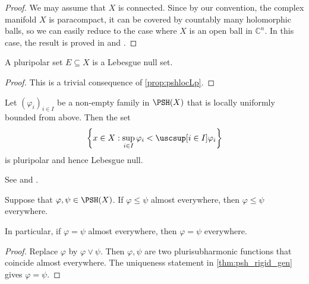 \begin{proof}
    We may assume that $X$ is connected. Since by our convention, the complex manifold $X$ is paracompact, it can be covered by countably many holomorphic balls, so we can easily reduce to the case where $X$ is an open ball in $\mathbb{C}^n$. In this case, the result is proved in \cite[Lemma~4.31]{GZ17} and \cite[Lemma~3.4.1]{FPT}.
\end{proof}



\begin{proposition}\label{prop:ppsnull}
    A pluripolar set $E\subseteq X$ is a Lebesgue null set.
\end{proposition}
\begin{proof}
    This is a trivial consequence of \cref{prop:pshlocLp}.
\end{proof}

\begin{proposition}\label{prop:supsupstardiff}
    Let $(\varphi_i)_{i\in I}$ be a non-empty family in $\PSH(X)$ that is locally uniformly bounded from above. Then the set
    \[
        \left\{x\in X: \sup_{i\in I}\varphi_i<\uscsup[i\in I]\varphi_i \right\}
    \]
    is pluripolar and hence Lebesgue null.
\end{proposition}
See \cite[Corollary~4.28]{GZ17} and \cite[Corollary~10.2.2]{FPT}.




\begin{proposition}\label{prop:pshfuncdetdense}
    Suppose that $\varphi,\psi\in \PSH(X)$. If $\varphi\leq \psi$ almost everywhere, then $\varphi\leq \psi$ everywhere.

    In particular, if $\varphi=\psi$ almost everywhere, then $\varphi=\psi$ everywhere.
\end{proposition}
\begin{proof}
    Replace $\varphi$ by $\varphi\lor\psi$. Then $\varphi,\psi$ are two plurisubharmonic functions that coincide almost everywhere. The uniqueness statement in \cref{thm:psh_rigid_gen} gives $\varphi=\psi$.
\end{proof}


